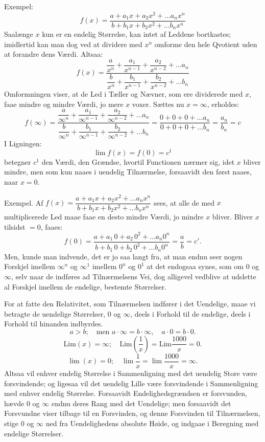 \documentclass[12pt]{book}
\newcommand{\opage}[1]{\marginnote{\footnotesize\textit{[#1]}}}
\begin{document}
Exempel:
\[
f(x) = \frac{a + a_1 x + a_2 x^{2} + \dots a_n x^{n}}{b + b_1 x + b_2 x^{2}
+ \dots b_n x^{n}}
\]
Saalænge $x$ kun er en endelig Størrelse, kan intet af Leddene bortkastes;
imidlertid kan man dog ved at dividere med $x^{n}$ omforme den hele Qvotient uden
at forandre dens Værdi. Altsaa:
\opage{48} \[
f(x) = \frac{\dfrac{a}{x^{n}} + \dfrac{a_1}{x^{n-1}} + \dfrac{a_2}{x^{n-2}}
+ \dots a_n}{\dfrac{b}{x^{n}} + \dfrac{b_1}{x^{n-1}} + \dfrac{b_2}{x^{n-2}}
+ \dots b_n}
\]
Omformningen viser, at de Led i Tæller og Nævner, som ere dividerede med $x$, faae
mindre og mindre Værdi, jo mere $x$ voxer. Sættes nu $x = \infty$, erholdes:
\[
f(\infty) = \frac{\dfrac{a}{\infty^{n}} + \dfrac{a_1}{\infty^{n-1}}
+ \dfrac{a_2}{\infty^{n-2}} + \dots a_n}{\dfrac{b}{\infty^{n}}
+ \dfrac{b_1}{\infty^{n-1}} + \dfrac{b_2}{\infty^{n-2}} + \dots b_n}
= \frac{0+0+0+\dots a_n}{0+0+0+\dots b_n} = \frac{a_n}{b_n} = c
\]
I Ligningen:
\[
\lim f(x) = f(0) = c^{1}
\]
betegner $c^{1}$ den Værdi, den Grændse, hvortil Functionen nærmer sig, idet $x$
bliver mindre, men som kun naaes i uendelig Tilnærmelse, forsaavidt den først
naaes, naar $x = 0$.

Exempel.
Af $f(x) = \dfrac{a + a_1 x + a_2 x^{2} + \dots a_n x^{n}}{b + b_1 x + b_2 x^{2}
+ \dots b_n x^{n}}$ sees, at alle de med $x$ multiplicerede Led maae faae en desto
mindre Værdi, jo mindre $x$ bliver. Bliver $x$ tilsidst $= 0$, faaes:
\[
f(0) = \frac{a + a_1\,0 + a_2\,0^{2} + \dots a_n 0^{n}}{b
+ b_1\,0 + b_2\,0^{2} + \dots b_n 0^{n}} = \frac{a}{b} = c'.
\]
Men, kunde man indvende, det er jo saa langt fra, at man endnu seer nogen Forskjel
imellem $\infty^{n}$ og $\infty^{1}$ imellem $0^{n}$ og $0^{1}$ at det endogsaa
synes, som om 0 og $\infty$, selv naar de indføres ad Tilnærmelsens Vei, dog
alligevel vedblive at udslette al Forskjel imellem de endelige, bestemte
Størrelser.

For at fatte den Relativitet, som Tilnærmelsen indfører i det Uendelige, maae vi
betragte de uendelige Størrelser, 0 og $\infty$, deels i Forhold til de endelige,
deels i Forhold til hinanden indbyrdes.
\opage{49} \[
a > b; \quad \text{men } a\cdot\infty = b\cdot\infty, \quad a\cdot 0 = b\cdot 0.
\]
\[
\mathrm{Lim}(x) = \infty; \quad \mathrm{Lim}\left(\frac{1}{x}\right)
= \mathrm{Lim}\frac{1000}{x} = 0.
\]
\[
\lim(x) = 0; \quad \lim\frac{1}{x} = \lim\frac{1000}{x} = \infty.
\]
Altsaa vil enhver endelig Størrelse i Sammenligning med det uendelig Store være
forsvindende; og ligesaa vil det uendelig Lille være forsvindende i Sammenligning
med enhver endelig Størrelse. Forsaavidt Endelighedsgrændsen er forsvunden, hævde
0 og $\infty$ endnu deres Rang med det Uendelige; men forsaavidt det Forsvundne
viser tilbage til en Forsvinden, og denne Forsvinden til Tilnærmelsen, stige 0 og
$\infty$ ned fra Uendelighedens absolute Høide, og indgaae i Beregning med
endelige Størrelser.
\end{document}
